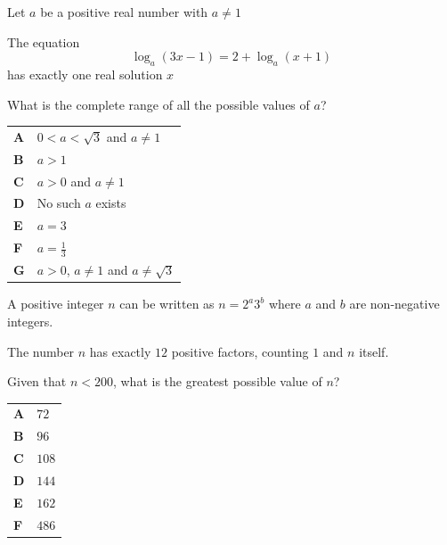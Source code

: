 \documentclass[11pt,a4paper]{article}
\begin{document}
\clearpage
\thispagestyle{djspaper}
\vspace*{8pt}
\begin{enumerate}[label=\textbf{\arabic*.},leftmargin=*,itemsep=0pt,start=4]
Let $a$ be a positive real number with $a \ne 1$

The equation \[ \log_a(3x-1) = 2 + \log_a(x+1) \] has exactly one real solution $x$

What is the complete range of all the possible values of $a$?

\par\vspace*{12pt}
\begin{tabularx}{\linewidth}{@{}>{\bfseries}l Y@{}}
A &
$0<a<\sqrt{3}$ and $a\ne 1$
\\[0.8em]
B &
$a > 1$
\\[0.8em]
C &
$a>0$ and $a \ne 1$
\\[0.8em]
D &
No such $a$ exists
\\[0.8em]
E &
$a=3$
\\[0.8em]
F &
$a=\frac{1}{3}$
\\[0.8em]
G &
$a>0$, $a \ne 1$ and $a \ne \sqrt{3}$
\\
\end{tabularx}
\end{enumerate}
\clearpage
\thispagestyle{djspaper}
\vspace*{8pt}
\begin{enumerate}[label=\textbf{\arabic*.},leftmargin=*,itemsep=0pt,start=5]
\questionitem[Number]
A positive integer $n$ can be written as $n = 2^a3^b$ where $a$ and $b$ are non-negative integers. 

The number $n$ has exactly $12$ positive factors, counting $1$ and $n$ itself. 

Given that $n<200$, what is the greatest possible value of $n$?

\par\vspace*{12pt}
\begin{tabularx}{\linewidth}{@{}>{\bfseries}l Y@{}}
A &
$72$
\\[0.8em]
B &
$96$
\\[0.8em]
C &
$108$
\\[0.8em]
D &
$144$
\\[0.8em]
E &
$162$
\\[0.8em]
F &
$486$
\\
\end{tabularx}
\end{enumerate}
\end{document}
